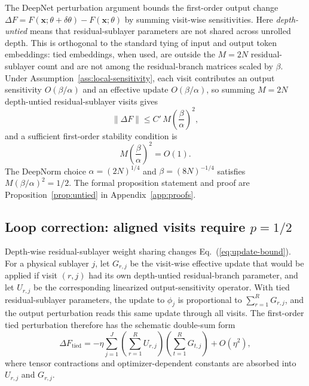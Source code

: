 \documentclass[11pt]{airesearch}
\begin{document}
The DeepNet perturbation argument bounds the first-order output change
$\Delta F=F(\mathbf{x};\theta+\delta\theta)-F(\mathbf{x};\theta)$ by summing
visit-wise sensitivities. Here \emph{depth-untied} means that residual-sublayer
parameters are not shared across unrolled depth. This is orthogonal to the
standard tying of input and output token embeddings: tied embeddings, when used,
are outside the $M=2N$ residual-sublayer count and are not among the
residual-branch matrices scaled by $\beta$. Under
Assumption~\ref{ass:local-sensitivity}, each visit contributes an output
sensitivity $O(\beta/\alpha)$ and an effective update $O(\beta/\alpha)$, so
summing $M=2N$ depth-untied residual-sublayer visits gives
\begin{equation}
  \|\Delta F\|
  \le
  C'\,M\left(\frac{\beta}{\alpha}\right)^2,
  \label{eq:update-bound}
\end{equation}
and a sufficient first-order stability condition is
\begin{equation}
  M\left(\frac{\beta}{\alpha}\right)^2 = O(1).
  \label{eq:deepnet-condition}
\end{equation}
The DeepNorm choice $\alpha=(2N)^{1/4}$ and $\beta=(8N)^{-1/4}$ satisfies
$M(\beta/\alpha)^2 = 1/2$. The formal proposition statement and proof are
Proposition~\ref{prop:untied} in Appendix~\ref{app:proofs}.

\subsection{Loop correction: aligned visits require \texorpdfstring{$p=1/2$}{p=1/2}}
\label{sec:method:loop}

Depth-wise residual-sublayer weight sharing changes Eq.~(\ref{eq:update-bound}).
For a physical sublayer $j$, let $G_{r,j}$ be the visit-wise effective update
that would be applied if visit $(r,j)$ had its own depth-untied residual-branch
parameter, and let $U_{r,j}$ be the corresponding linearized
output-sensitivity operator. With tied residual-sublayer parameters, the
update to $\phi_j$ is proportional to $\sum_{r=1}^{R}G_{r,j}$, and the output
perturbation reads this same update through all visits. The first-order tied
perturbation therefore has the schematic double-sum form
\begin{equation}
  \Delta F_{\mathrm{tied}}
  = -\eta \sum_{j=1}^{J}
  \left(\sum_{r=1}^{R} U_{r,j}\right)
  \left(\sum_{t=1}^{R} G_{t,j}\right) + O(\eta^2),
  \label{eq:shared-grad}
\end{equation}
where tensor contractions and optimizer-dependent constants are absorbed into
$U_{r,j}$ and $G_{r,j}$.
\end{document}
